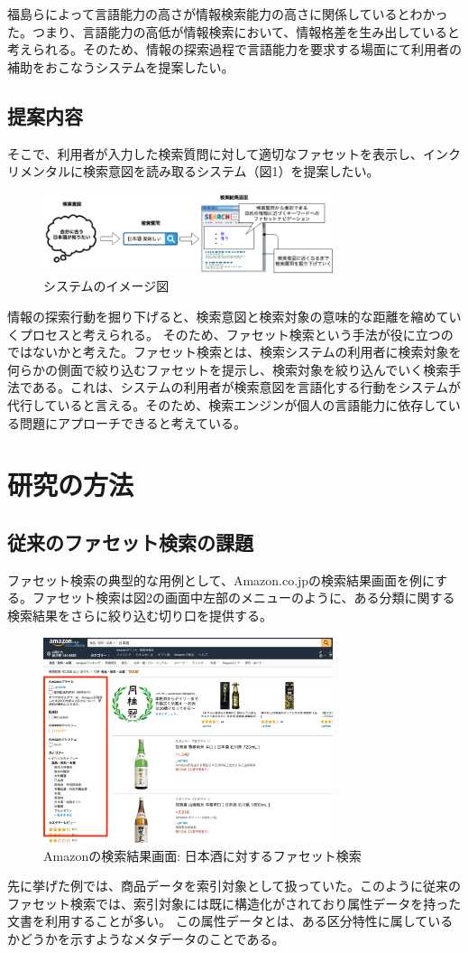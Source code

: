 \documentclass[a4j,10pt, twocolumn]{jarticle} \usepackage[dvipdfmx]{graphicx} \usepackage{amssymb} \usepackage{amsmath}
\begin{document}
 福島らによって言語能力の高さが情報検索能力の高さに関係しているとわかった\cite{fukushima}。つまり、言語能力の高低が情報検索において、情報格差を生み出していると考えられる。そのため、情報の探索過程で言語能力を要求する場面にて利用者の補助をおこなうシステムを提案したい。
\subsection{提案内容}

 そこで、利用者が入力した検索質問に対して適切なファセットを表示し、インクリメンタルに検索意図を読み取るシステム（図1）を提案したい。

 \begin{figure}[h]
   \includegraphics[width=85mm]{./new_ir_with_navi.png}
   \caption{システムのイメージ図}
 \end{figure}
 
 情報の探索行動を掘り下げると、検索意図と検索対象の意味的な距離を縮めていくプロセスと考えられる。 そのため、ファセット検索という手法が役に立つのではないかと考えた。ファセット検索とは、検索システムの利用者に検索対象を何らかの側面で絞り込むファセットを提示し、検索対象を絞り込んでいく検索手法である\cite{faceted}。これは、システムの利用者が検索意図を言語化する行動をシステムが代行していると言える。そのため、検索エンジンが個人の言語能力に依存している問題にアプローチできると考えている。
\section{研究の方法}
\subsection{従来のファセット検索の課題}
 ファセット検索の典型的な用例として、Amazon.co.jp\cite{amazon}の検索結果画面を例にする。ファセット検索は図2の画面中左部のメニューのように、ある分類に関する検索結果をさらに絞り込む切り口を提供する。
 \begin{figure}[h]
   \includegraphics[width=85mm]{./amazon.png}
   \caption{Amazonの検索結果画面: 日本酒に対するファセット検索}
 \end{figure}
  先に挙げた例では、商品データを索引対象として扱っていた。このように従来のファセット検索では、索引対象には既に構造化がされており属性データを持った文書を利用することが多い。
  この属性データとは、ある区分特性に属しているかどうかを示すようなメタデータのことである。
\end{document}
